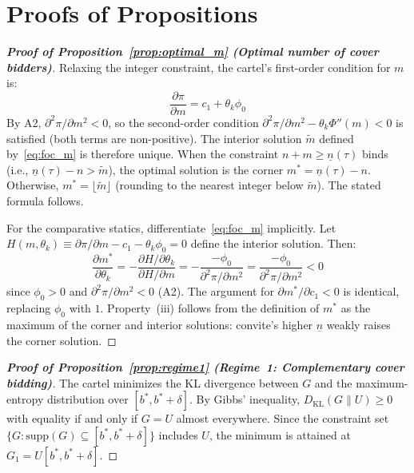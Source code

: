 
\section{Proofs of Propositions}\label{app:proofs}

\begin{proof}[\textbf{Proof of Proposition~\ref{prop:optimal_m} (Optimal number of cover bidders)}]
Relaxing the integer constraint, the cartel's first-order condition
for $m$ is:
\begin{equation}
  \frac{\partial \pi}{\partial m} = c_1 + \theta_k \phi_0
  \label{eq:foc_m}
\end{equation}
By A2, $\partial^2 \pi / \partial m^2 < 0$, so the second-order
condition $\partial^2 \pi / \partial m^2 - \theta_k \Phi''(m) < 0$
is satisfied (both terms are non-positive). The interior solution
$\tilde{m}$ defined by~\eqref{eq:foc_m} is therefore unique. When
the constraint $n + m \geq \underline{n}(\tau)$ binds (i.e.,
$\underline{n}(\tau) - n > \tilde{m}$), the optimal solution is
the corner $m^* = \underline{n}(\tau) - n$. Otherwise,
$m^* = \lfloor \tilde{m} \rfloor$ (rounding to the nearest integer
below $\tilde{m}$). The stated formula follows.

For the comparative statics, differentiate~\eqref{eq:foc_m} implicitly.
Let $H(m, \theta_k) \equiv \partial \pi / \partial m - c_1 -
\theta_k \phi_0 = 0$ define the interior solution. Then:
\[
  \frac{\partial m^*}{\partial \theta_k} =
  -\frac{\partial H / \partial \theta_k}{\partial H / \partial m}
  = -\frac{-\phi_0}{\partial^2 \pi / \partial m^2}
  = \frac{-\phi_0}{\partial^2 \pi / \partial m^2} < 0
\]
since $\phi_0 > 0$ and $\partial^2 \pi / \partial m^2 < 0$ (A2).
The argument for $\partial m^* / \partial c_1 < 0$ is identical,
replacing $\phi_0$ with $1$. Property~(iii) follows from the
definition of $m^*$ as the maximum of the corner and interior
solutions: convite's higher $\underline{n}$ weakly raises the corner
solution.
\end{proof}

\begin{proof}[\textbf{Proof of Proposition~\ref{prop:regime1} (Regime~1: Complementary cover bidding)}]
The cartel minimizes the KL divergence between $G$ and the maximum-entropy
distribution over $[b^*, b^* + \delta]$. By Gibbs' inequality,
$D_{\text{KL}}(G \| U) \geq 0$ with equality if and only if $G = U$
almost everywhere. Since the constraint set
$\{G : \text{supp}(G) \subseteq [b^*, b^* + \delta]\}$ includes $U$,
the minimum is attained at $G_1 = U[b^*, b^* + \delta]$.
\end{proof}

